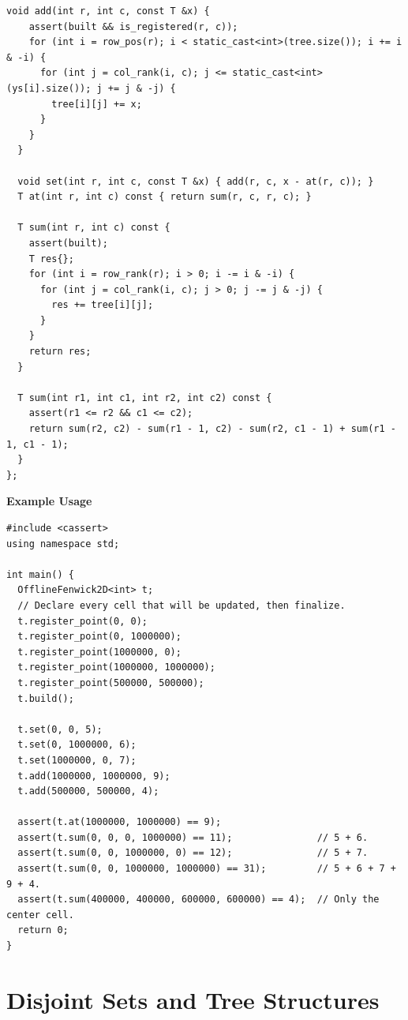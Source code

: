 \begin{lstlisting}[style=cpp]
  void add(int r, int c, const T &x) {
    assert(built && is_registered(r, c));
    for (int i = row_pos(r); i < static_cast<int>(tree.size()); i += i & -i) {
      for (int j = col_rank(i, c); j <= static_cast<int>(ys[i].size()); j += j & -j) {
        tree[i][j] += x;
      }
    }
  }

  void set(int r, int c, const T &x) { add(r, c, x - at(r, c)); }
  T at(int r, int c) const { return sum(r, c, r, c); }

  T sum(int r, int c) const {
    assert(built);
    T res{};
    for (int i = row_rank(r); i > 0; i -= i & -i) {
      for (int j = col_rank(i, c); j > 0; j -= j & -j) {
        res += tree[i][j];
      }
    }
    return res;
  }

  T sum(int r1, int c1, int r2, int c2) const {
    assert(r1 <= r2 && c1 <= c2);
    return sum(r2, c2) - sum(r1 - 1, c2) - sum(r2, c1 - 1) + sum(r1 - 1, c1 - 1);
  }
};
\end{lstlisting}
\textbf{Example Usage}\par
\begin{lstlisting}[style=cpp]
#include <cassert>
using namespace std;

int main() {
  OfflineFenwick2D<int> t;
  // Declare every cell that will be updated, then finalize.
  t.register_point(0, 0);
  t.register_point(0, 1000000);
  t.register_point(1000000, 0);
  t.register_point(1000000, 1000000);
  t.register_point(500000, 500000);
  t.build();

  t.set(0, 0, 5);
  t.set(0, 1000000, 6);
  t.set(1000000, 0, 7);
  t.add(1000000, 1000000, 9);
  t.add(500000, 500000, 4);

  assert(t.at(1000000, 1000000) == 9);
  assert(t.sum(0, 0, 0, 1000000) == 11);               // 5 + 6.
  assert(t.sum(0, 0, 1000000, 0) == 12);               // 5 + 7.
  assert(t.sum(0, 0, 1000000, 1000000) == 31);         // 5 + 6 + 7 + 9 + 4.
  assert(t.sum(400000, 400000, 600000, 600000) == 4);  // Only the center cell.
  return 0;
}
\end{lstlisting}

\section{\texorpdfstring{Disjoint Sets and Tree Structures}{2.8 Disjoint Sets and Tree Structures}}
\setcounter{section}{8}
\setcounter{subsection}{0}
